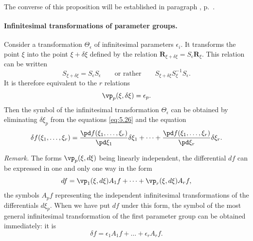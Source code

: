 The converse of this proposition will be established in paragraph , p.~\pageref{sec:83}.

\paragraph{Infinitesimal transformations of parameter groups.}
\label{sec:81}
Consider a transformation $\Theta_{\epsilon}$ of infinitesimal parameters $\epsilon_{i}$. It transforms the point $\xi$ into the point $\xi+\delta\xi$ defined by the relation $\mathbf{R}_{\xi+\delta\xi}=S_{\epsilon}\mathbf{R}_{\xi}$. This relation can be written
\[
S_{\xi+\delta\xi}=S_{\epsilon}S_{\epsilon}\qquad\text{or rather}\qquad S_{\xi+\delta\xi}S_{\xi}^{-1}S_{\epsilon}.
\]
It is therefore equivalent to the $r$ relations
\begin{equation}
  \label{eq:5.26}
  \vp_{p}(\xi,\delta\xi)=\epsilon_{p}.
\end{equation}
Then the symbol of the infinitesimal transformation $\Theta_{\epsilon}$ can be obtained by eliminating $\delta\xi_{p}$ from the equations \eqref{eq:5.26} and the equation
\[
\delta f(\xi_{1},\dots,\xi_{r})=\frac{\pd f(\xi_{1},\dots,\xi_{r})}{\pd\xi_{1}}\delta\xi_{1}+\dots+\frac{\pd f(\xi_{1},\dots,\xi_{r})}{\pd \xi_{r}}\delta\xi_{r}.
\]
\somespace

\emph{Remark.} The forms $\vp_{p}(\xi,d\xi)$ being linearly independent, the differential $df$ can be expressed in one and only one way in the form
\begin{equation}
  \label{eq:5.27}
  df=\vp_{1}(\xi,d\xi)A_{1}f+\dots+\vp_{r}(\xi,d\xi)A_{r}f,
\end{equation}
the symbols $A_{p}f$ representing the independent infinitesimal transformations of the differentials $d\xi_{p}$. When we have put $df$ under this form, the symbol of the most general infinitesimal transformation of the first parameter group can be obtained immediately: it is
\begin{equation}
  \label{eq:5.28}
  \delta f=\epsilon_{1}A_{1}f+\dots+\epsilon_{r}A_{r}f.
\end{equation}

\somespace

